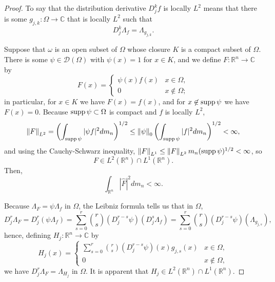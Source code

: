 \documentclass{article}
\newcommand{\supp}{\ensuremath\mathrm{supp}\,}
\newcommand{\norm}[1]{\left\Vert #1 \right\Vert}
\theoremstyle{definition}
\begin{document}
\begin{proof}
To say that the distribution derivative $D_j^k f$ is locally $L^2$ means that there is some $g_{j,k}:\Omega \to \mathbb{C}$ that is locally $L^2$ such that 
\[
D_j^k \Lambda_f = \Lambda_{g_{j,k}}.
\]

Suppose that  $\omega$ is an open subset of $\Omega$ whose closure $K$ is a compact subset of $\Omega$. There is some $\psi \in \mathscr{D}(\Omega)$
with $\psi(x)=1$ for $x \in K$, and we define $F:\mathbb{R}^n \to \mathbb{C}$ by
\[
F(x) = \begin{cases}
\psi(x)f(x)&x \in \Omega,\\
0&x \not \in \Omega;
\end{cases}
\]
in particular, for $x \in K$ we have $F(x)=f(x)$, and for $x \not \in \supp \psi$ we have $F(x)=0$.
Because $\supp \psi \subset \Omega$ is compact and $f$ is locally $L^2$,
\[
\norm{F}_{L^2} = \left( \int_{\supp \psi} |\psi f|^2 dm_n\right)^{1/2} \leq \norm{\psi}_0 \left(\int_{\supp \psi} |f|^2 dm_n \right)^{1/2} < \infty,
\]
and using the Cauchy-Schwarz inequality, $\norm{F}_{L^1} \leq \norm{F}_{L^2} m_n(\supp \psi)^{1/2}<\infty$, so
\[
F \in L^2(\mathbb{R}^n) \cap L^1(\mathbb{R}^n).
\]
Then,
\begin{equation}
\int_{\mathbb{R}^n} |\widehat{F}|^2 dm_n < \infty.
\label{Fhat}
\end{equation}

Because $\Lambda_F = \psi \Lambda_f$ in $\Omega$,
 the Leibniz formula tells us that in $\Omega$,
\[
D_j^r \Lambda_F =D_j^r(\psi \Lambda_f)
=\sum_{s=0}^r \binom{r}{s} (D_j^{r-s} \psi)(D_j^s \Lambda_f)
=\sum_{s=0}^r \binom{r}{s} (D_j^{r-s} \psi)(\Lambda_{g_{j,s}}),
\]
hence, defining $H_j:\mathbb{R}^n \to \mathbb{C}$ by
\[
H_j(x) = \begin{cases}
\sum_{s=0}^r \binom{r}{s} (D_j^{r-s} \psi)(x)g_{j,s}(x)&x \in \Omega,\\
0&x \not \in \Omega,
\end{cases}
\]
we have $D_j^r \Lambda_F = \Lambda_{H_j}$
in $\Omega$.  It is apparent that $H_j \in L^2(\mathbb{R}^n) \cap L^1(\mathbb{R}^n)$.


\end{proof}
\end{document}
